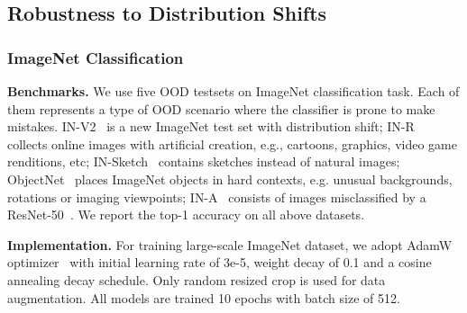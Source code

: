 \documentclass[pdflatex,sn-basic,iicol]{sn-jnl}
\theoremstyle{thmstyleone}\newtheorem{theorem}{Theorem}\newtheorem{proposition}[theorem]{Proposition}
\theoremstyle{thmstyletwo}\newtheorem{example}{Example}\newtheorem{remark}{Remark}
\theoremstyle{thmstylethree}\newtheorem{definition}{Definition}
\begin{document}
\subsection{Robustness to Distribution Shifts}

\subsubsection{ImageNet Classification} \label{sec:imagenet_exp}

\noindent\textbf{Benchmarks.} We use five OOD testsets on ImageNet classification task. Each of them represents a type of OOD scenario where the classifier is prone to make mistakes. IN-V2~\citep{recht2019imagenet} is a new ImageNet test set with distribution shift; IN-R~\citep{hendrycks2021many} collects online images with artificial creation, e.g., cartoons, graphics, video game renditions, etc; IN-Sketch~\citep{wang2019learning} contains sketches instead of natural images; ObjectNet~\citep{barbu2019objectnet} places ImageNet objects in hard contexts, e.g. unusual backgrounds, rotations or imaging viewpoints; IN-A~\citep{hendrycks2021natural} consists of images misclassified by a ResNet-50~\citep{he2016deep}. We report the top-1 accuracy on all above datasets. 

\noindent\textbf{Implementation.} For training large-scale ImageNet dataset, we adopt AdamW optimizer~\citep{loshchilov2018decoupled} with initial learning rate of 3e-5, weight decay of 0.1 and a cosine annealing decay schedule. Only random resized crop is used for data augmentation. All models are trained 10 epochs with batch size of 512.
\end{document}
